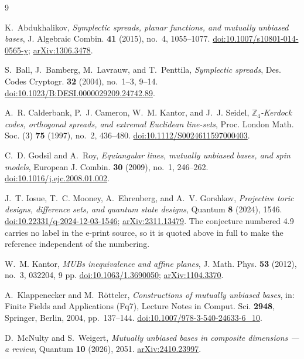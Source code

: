 \documentclass[11pt]{amsart}
\theoremstyle{remark}
\begin{document}
\begin{thebibliography}{9}

K.~Abdukhalikov,
\emph{Symplectic spreads, planar functions, and mutually unbiased bases},
J. Algebraic Combin. \textbf{41} (2015), no.~4, 1055--1077.
\href{https://doi.org/10.1007/s10801-014-0565-y}{doi:10.1007/s10801-014-0565-y};
\href{https://arxiv.org/abs/1306.3478}{arXiv:1306.3478}.

S.~Ball, J.~Bamberg, M.~Lavrauw, and T.~Penttila,
\emph{Symplectic spreads},
Des. Codes Cryptogr. \textbf{32} (2004), no.~1--3, 9--14.
\href{https://doi.org/10.1023/B:DESI.0000029209.24742.89}
{doi:10.1023/B:DESI.0000029209.24742.89}.

A.~R. Calderbank, P.~J. Cameron, W.~M. Kantor, and J.~J. Seidel,
\emph{$\mathbb Z_{4}$-Kerdock codes, orthogonal spreads, and extremal Euclidean
line-sets},
Proc. London Math. Soc. (3) \textbf{75} (1997), no.~2, 436--480.
\href{https://doi.org/10.1112/S0024611597000403}{doi:10.1112/S0024611597000403}.

C.~D. Godsil and A.~Roy,
\emph{Equiangular lines, mutually unbiased bases, and spin models},
European J. Combin. \textbf{30} (2009), no.~1, 246--262.
\href{https://doi.org/10.1016/j.ejc.2008.01.002}{doi:10.1016/j.ejc.2008.01.002}.

J.~T. Iosue, T.~C. Mooney, A.~Ehrenberg, and A.~V. Gorshkov,
\emph{Projective toric designs, difference sets, and quantum state designs},
Quantum \textbf{8} (2024), 1546.
\href{https://doi.org/10.22331/q-2024-12-03-1546}{doi:10.22331/q-2024-12-03-1546};
\href{https://arxiv.org/abs/2311.13479}{arXiv:2311.13479}.
The conjecture numbered 4.9 carries no label in the e-print source, so it is
quoted above in full to make the reference independent of the numbering.

W.~M. Kantor,
\emph{MUBs inequivalence and affine planes},
J. Math. Phys. \textbf{53} (2012), no.~3, 032204, 9 pp.
\href{https://doi.org/10.1063/1.3690050}{doi:10.1063/1.3690050};
\href{https://arxiv.org/abs/1104.3370}{arXiv:1104.3370}.

A.~Klappenecker and M.~R\"otteler,
\emph{Constructions of mutually unbiased bases},
in: Finite Fields and Applications (Fq7), Lecture Notes in Comput. Sci.
\textbf{2948}, Springer, Berlin, 2004, pp.~137--144.
\href{https://doi.org/10.1007/978-3-540-24633-6_10}
{doi:10.1007/978-3-540-24633-6\_10}.

D.~McNulty and S.~Weigert,
\emph{Mutually unbiased bases in composite dimensions --- a review},
Quantum \textbf{10} (2026), 2051.
\href{https://arxiv.org/abs/2410.23997}{arXiv:2410.23997}.

\end{thebibliography}
\end{document}

